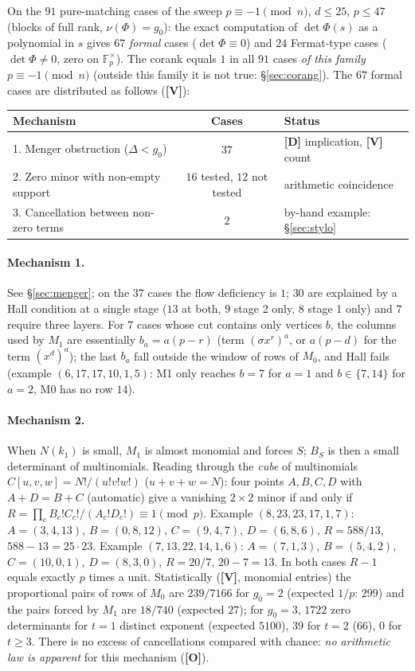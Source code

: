 \documentclass[11pt,a4paper]{article}
\newcommand{\F}{\mathbb{F}}
\begin{document}
On the $91$ pure-matching cases of the sweep $p\equiv-1\pmod n$, $d\le25$,
$p\le47$ (blocks of full rank, $\nu(\Phi)=g_0$): the exact computation of
$\det\Phi(s)$ as a polynomial in $s$ gives $67$ \emph{formal} cases
($\det\Phi\equiv0$) and $24$ Fermat-type cases ($\det\Phi\ne0$, zero on
$\F_p^\times$). The corank equals $1$ in all $91$ cases \emph{of this family}
$p\equiv-1\pmod n$ (outside this family it is not true: \S\ref{sec:corang}). The
$67$ formal cases are distributed as follows (\textbf{[V]}):

\begin{center}
\begin{tabular}{lcl}
Mechanism & Cases & Status\\\hline
1. Menger obstruction ($\Delta<g_0$) & $37$ & \textbf{[D]} implication, \textbf{[V]} count\\
2. Zero minor with non-empty support & $16$ tested, $12$ not tested & arithmetic coincidence\\
3. Cancellation between non-zero terms & $2$ & by-hand example: \S\ref{sec:stylo}\\\hline
\end{tabular}
\end{center}

\paragraph{Mechanism 1.} See \S\ref{sec:menger}; on the $37$ cases the flow
deficiency is $1$; $30$ are explained by a Hall condition at a single stage ($13$
at both, $9$ stage 2 only, $8$ stage 1 only) and $7$ require three layers. For
$7$ cases whose cut contains only vertices $b$, the columns used by $M_1$ are
essentially $b_a=a(p-r)$ (term $(\sigma x^r)^a$, or $a(p-d)$ for the term
$(x^d)^a$); the last $b_a$ fall outside the window of rows of $M_0$, and Hall
fails (example $(6,17,17,10,1,5)$: M1 only reaches $b=7$ for $a=1$ and
$b\in\{7,14\}$ for $a=2$, M0 has no row $14$).

\paragraph{Mechanism 2.} When $N(k_1)$ is small, $M_1$ is almost monomial and
forces $S$; $B_S$ is then a small determinant of multinomials. Reading through
the \emph{cube} of multinomials $C[u,v,w]=N!/(u!v!w!)$ ($u+v+w=N$): four points
$A,B,C,D$ with $A+D=B+C$ (automatic) give a vanishing $2\times2$ minor if and
only if $R=\prod_c B_c!C_c!/(A_c!D_c!)\equiv1\pmod p$. Example
$(8,23,23,17,1,7)$: $A=(3,4,13)$, $B=(0,8,12)$, $C=(9,4,7)$, $D=(6,8,6)$,
$R=588/13$, $588-13=25\cdot23$. Example $(7,13,22,14,1,6)$: $A=(7,1,3)$,
$B=(5,4,2)$, $C=(10,0,1)$, $D=(8,3,0)$, $R=20/7$, $20-7=13$. In both cases
$R-1$ equals exactly $p$ times a unit. Statistically (\textbf{[V]}, monomial
entries) the proportional pairs of rows of $M_0$ are $239/7166$ for $g_0=2$
(expected $1/p$: $299$) and the pairs forced by $M_1$ are $18/740$ (expected
$27$); for $g_0=3$, $1722$ zero determinants for $t=1$ distinct exponent
(expected $5100$), $39$ for $t=2$ ($66$), $0$ for $t\ge3$. There is no excess of
cancellations compared with chance: \emph{no arithmetic law is apparent} for this
mechanism (\textbf{[O]}).
\end{document}
